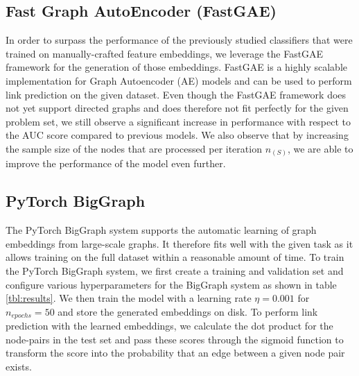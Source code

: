 \documentclass[11pt, oneside]{article}
\begin{document}
\subsection{Fast Graph AutoEncoder (FastGAE)}
\label{sec:fastgae}
\vspace{-5pt}
In order to surpass the performance of the previously studied classifiers that were trained on manually-crafted feature embeddings, we leverage the FastGAE framework \cite{fastgae} for the generation of those embeddings. FastGAE is a highly scalable implementation for Graph Autoencoder (AE) models \cite{Kipf2016VariationalGA} and can be used to perform link prediction on the given dataset. Even though the FastGAE framework does not yet support directed graphs and does therefore not fit perfectly for the given problem set, we still observe a significant increase in performance with respect to the AUC score compared to previous models. We also observe that by increasing the sample size of the nodes that are processed per iteration $n_{(S)}$, we are able to improve the performance of the model even further.
\vspace{-10pt}
\subsection{PyTorch BigGraph}
\label{sec:biggraph}
\vspace{-5pt}
The PyTorch BigGraph system \cite{pbg} supports the automatic learning of graph embeddings from large-scale graphs. It therefore fits well with the given task as it allows training on the full dataset within a reasonable amount of time. To train the PyTorch BigGraph system, we first create a training and validation set and configure various hyperparameters for the BigGraph system as shown in table \ref{tbl:results}. We then train the model with a learning rate $\eta = 0.001$ for $n_{epochs}=50$ and store the generated embeddings on disk. To perform link prediction with the learned embeddings, we calculate the dot product for the node-pairs in the test set and pass these scores through the sigmoid function to transform the score into the probability that an edge between a given node pair exists.
\vspace{-10pt}
\end{document}
